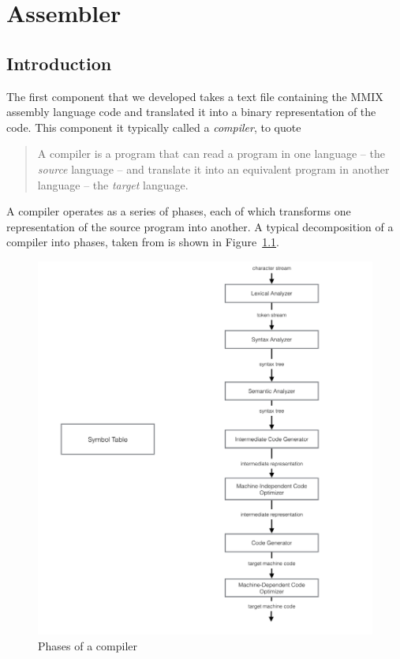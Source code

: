 \documentclass[a4paper,11pt]{report}
\begin{document}
\chapter{Assembler}
\section{Introduction}
The first component that we developed takes a text file containing the MMIX assembly language code and translated it into a binary representation of the code.  This component it typically called a \textit{compiler}, to quote \cite{dragon}

\begin{quote}
A compiler is a program that can read a program in one language -- the \textit{source} language -- and translate it into an equivalent program in another language -- the \textit{target} language.
\end{quote}

A compiler operates as a series of phases, each of which transforms one representation of the source program into another. A typical decomposition of a compiler into phases, taken from \cite{dragon} is shown in Figure~\ref{CompilerPhases}.
\begin{figure}[ht!]
\centering
\includegraphics[width=\textwidth]{PhasesOfACompiler}
\caption{Phases of a compiler}
\label{CompilerPhases}
\end{figure}
\end{document}
